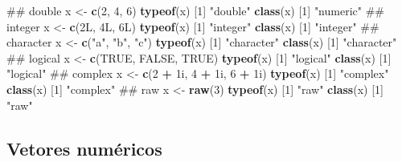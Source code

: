 \documentclass[10pt,a4paper]{book}
\newenvironment{Shaded}{\begin{snugshade}}{\end{snugshade}}
\newcommand{\KeywordTok}[1]{\textcolor[rgb]{0.13,0.29,0.53}{\textbf{#1}}}
\newcommand{\DecValTok}[1]{\textcolor[rgb]{0.00,0.00,0.81}{#1}}
\newcommand{\StringTok}[1]{\textcolor[rgb]{0.31,0.60,0.02}{#1}}
\newcommand{\OtherTok}[1]{\textcolor[rgb]{0.56,0.35,0.01}{#1}}
\newcommand{\OperatorTok}[1]{\textcolor[rgb]{0.81,0.36,0.00}{\textbf{#1}}}
\newcommand{\NormalTok}[1]{#1}
\begin{document}
\begin{Shaded}
\begin{Highlighting}[]
\NormalTok{## double}
\NormalTok{x <-}\StringTok{ }\KeywordTok{c}\NormalTok{(}\DecValTok{2}\NormalTok{, }\DecValTok{4}\NormalTok{, }\DecValTok{6}\NormalTok{)}
\KeywordTok{typeof}\NormalTok{(x)}
\NormalTok{[}\DecValTok{1}\NormalTok{] }\StringTok{"double"}
\KeywordTok{class}\NormalTok{(x)}
\NormalTok{[}\DecValTok{1}\NormalTok{] }\StringTok{"numeric"}
\NormalTok{## integer}
\NormalTok{x <-}\StringTok{ }\KeywordTok{c}\NormalTok{(2L, 4L, 6L)}
\KeywordTok{typeof}\NormalTok{(x)}
\NormalTok{[}\DecValTok{1}\NormalTok{] }\StringTok{"integer"}
\KeywordTok{class}\NormalTok{(x)}
\NormalTok{[}\DecValTok{1}\NormalTok{] }\StringTok{"integer"}
\NormalTok{## character}
\NormalTok{x <-}\StringTok{ }\KeywordTok{c}\NormalTok{(}\StringTok{"a"}\NormalTok{, }\StringTok{"b"}\NormalTok{, }\StringTok{"c"}\NormalTok{)}
\KeywordTok{typeof}\NormalTok{(x)}
\NormalTok{[}\DecValTok{1}\NormalTok{] }\StringTok{"character"}
\KeywordTok{class}\NormalTok{(x)}
\NormalTok{[}\DecValTok{1}\NormalTok{] }\StringTok{"character"}
\NormalTok{## logical}
\NormalTok{x <-}\StringTok{ }\KeywordTok{c}\NormalTok{(}\OtherTok{TRUE}\NormalTok{, }\OtherTok{FALSE}\NormalTok{, }\OtherTok{TRUE}\NormalTok{)}
\KeywordTok{typeof}\NormalTok{(x)}
\NormalTok{[}\DecValTok{1}\NormalTok{] }\StringTok{"logical"}
\KeywordTok{class}\NormalTok{(x)}
\NormalTok{[}\DecValTok{1}\NormalTok{] }\StringTok{"logical"}
\NormalTok{## complex}
\NormalTok{x <-}\StringTok{ }\KeywordTok{c}\NormalTok{(}\DecValTok{2} \OperatorTok{+}\StringTok{ }\NormalTok{1i, }\DecValTok{4} \OperatorTok{+}\StringTok{ }\NormalTok{1i, }\DecValTok{6} \OperatorTok{+}\StringTok{ }\NormalTok{1i)}
\KeywordTok{typeof}\NormalTok{(x)}
\NormalTok{[}\DecValTok{1}\NormalTok{] }\StringTok{"complex"}
\KeywordTok{class}\NormalTok{(x)}
\NormalTok{[}\DecValTok{1}\NormalTok{] }\StringTok{"complex"}
\NormalTok{## raw}
\NormalTok{x <-}\StringTok{ }\KeywordTok{raw}\NormalTok{(}\DecValTok{3}\NormalTok{)}
\KeywordTok{typeof}\NormalTok{(x)}
\NormalTok{[}\DecValTok{1}\NormalTok{] }\StringTok{"raw"}
\KeywordTok{class}\NormalTok{(x)}
\NormalTok{[}\DecValTok{1}\NormalTok{] }\StringTok{"raw"}
\end{Highlighting}
\end{Shaded}

\subsection{Vetores numéricos}\label{vetores-numericos}
\end{document}
